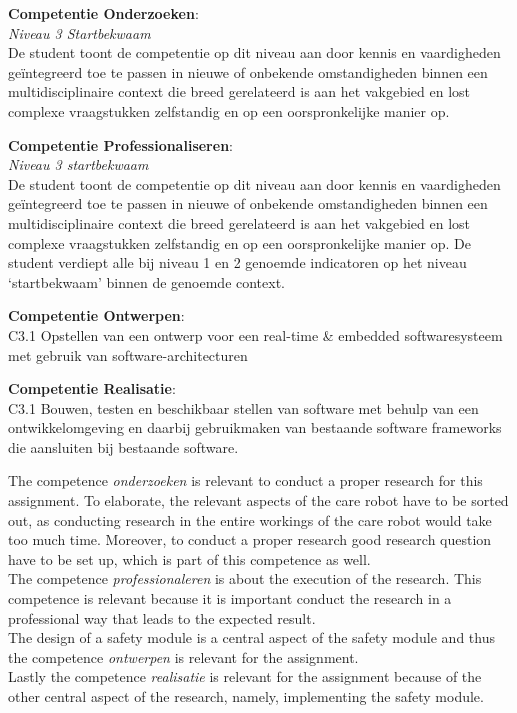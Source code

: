 \documentclass[12pt]{scrreprt}
\begin{document}
\begin{description}

\item \textbf{Competentie Onderzoeken}:\\
\textit{Niveau 3 Startbekwaam}\\
De student toont de competentie op dit niveau aan door kennis en vaardigheden geïntegreerd toe te passen in nieuwe of onbekende omstandigheden binnen een multidisciplinaire context die breed gerelateerd is aan het vakgebied en lost complexe vraagstukken zelfstandig en op een oorspronkelijke manier op.

\item \textbf{Competentie Professionaliseren}:\\
\textit{Niveau 3 startbekwaam}\\
De student toont de competentie op dit niveau aan door kennis en vaardigheden geïntegreerd toe te passen in nieuwe of onbekende omstandigheden binnen een multidisciplinaire context die breed gerelateerd is aan het vakgebied en lost complexe vraagstukken zelfstandig en op een oorspronkelijke manier op.
De student verdiept alle bij niveau 1 en 2 genoemde indicatoren op het niveau ‘startbekwaam’ binnen de genoemde context.

\item \textbf{Competentie Ontwerpen}:\\
C3.1 Opstellen van een ontwerp voor een real-time \& embedded softwaresysteem met gebruik van software-architecturen

\item \textbf{Competentie Realisatie}:\\
C3.1 Bouwen, testen en beschikbaar stellen van software met behulp van een ontwikkelomgeving en daarbij gebruikmaken van bestaande software frameworks die aansluiten bij bestaande software.
\end{description}

The competence \textit{onderzoeken} is relevant to conduct a proper research for this assignment. To elaborate, the relevant aspects of the care robot have to be sorted out, as conducting research in the entire workings of the care robot would take too much time. Moreover, to conduct a proper research good research question have to be set up, which is part of this competence as well.\\
The competence \textit{professionaleren} is about the execution of the research. This competence is relevant because it is important conduct the research in a professional way that leads to the expected result.\\
The design of a safety module is a central aspect of the safety module and thus the competence \textit{ontwerpen} is relevant for the assignment.\\
Lastly the competence \textit{realisatie} is relevant for the assignment because of the other central aspect of the research, namely, implementing the safety module.
\end{document}
